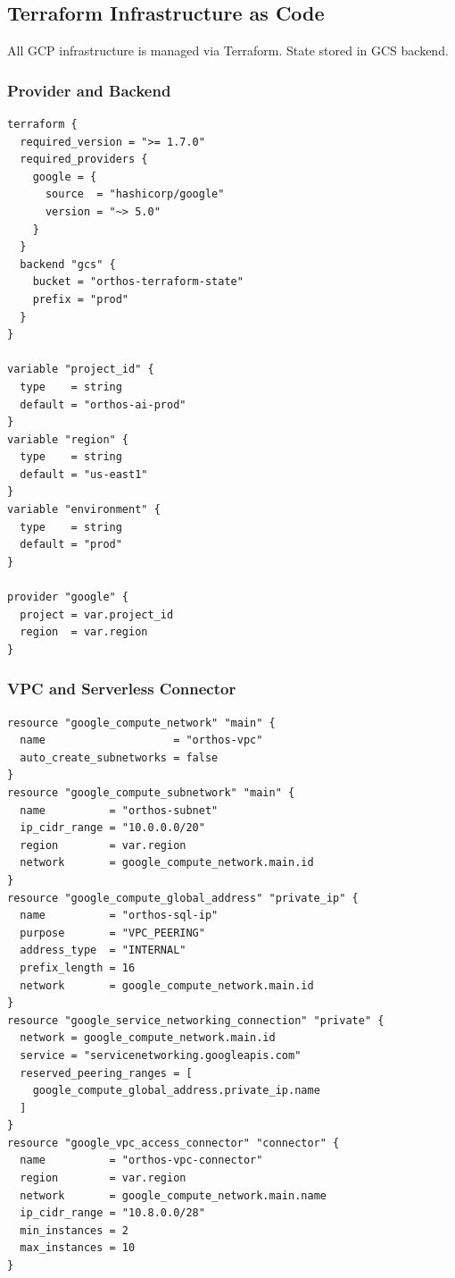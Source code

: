 \documentclass[11pt,a4paper]{article}
\begin{document}
\subsection{Terraform Infrastructure as Code}
\label{sec:terraform}

All GCP infrastructure is managed via Terraform. State stored in GCS backend.

\subsubsection{Provider and Backend}

\begin{lstlisting}[language=hcl]
terraform {
  required_version = ">= 1.7.0"
  required_providers {
    google = {
      source  = "hashicorp/google"
      version = "~> 5.0"
    }
  }
  backend "gcs" {
    bucket = "orthos-terraform-state"
    prefix = "prod"
  }
}

variable "project_id" {
  type    = string
  default = "orthos-ai-prod"
}
variable "region" {
  type    = string
  default = "us-east1"
}
variable "environment" {
  type    = string
  default = "prod"
}

provider "google" {
  project = var.project_id
  region  = var.region
}
\end{lstlisting}

\subsubsection{VPC and Serverless Connector}

\begin{lstlisting}[language=hcl]
resource "google_compute_network" "main" {
  name                    = "orthos-vpc"
  auto_create_subnetworks = false
}
resource "google_compute_subnetwork" "main" {
  name          = "orthos-subnet"
  ip_cidr_range = "10.0.0.0/20"
  region        = var.region
  network       = google_compute_network.main.id
}
resource "google_compute_global_address" "private_ip" {
  name          = "orthos-sql-ip"
  purpose       = "VPC_PEERING"
  address_type  = "INTERNAL"
  prefix_length = 16
  network       = google_compute_network.main.id
}
resource "google_service_networking_connection" "private" {
  network = google_compute_network.main.id
  service = "servicenetworking.googleapis.com"
  reserved_peering_ranges = [
    google_compute_global_address.private_ip.name
  ]
}
resource "google_vpc_access_connector" "connector" {
  name          = "orthos-vpc-connector"
  region        = var.region
  network       = google_compute_network.main.name
  ip_cidr_range = "10.8.0.0/28"
  min_instances = 2
  max_instances = 10
}
\end{lstlisting}
\end{document}

